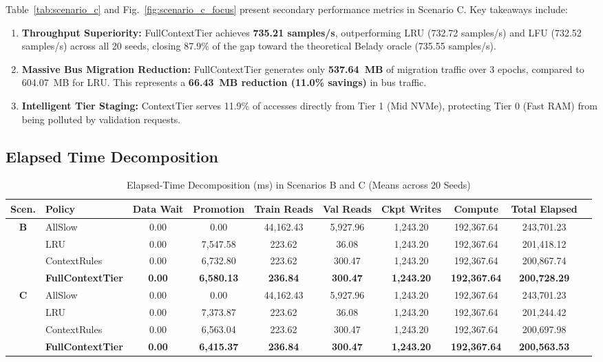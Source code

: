 \documentclass[conference]{IEEEtran}
\begin{document}
Table~\ref{tab:scenario_c} and Fig.~\ref{fig:scenario_c_focus} present secondary performance metrics in Scenario C. Key takeaways include:
\begin{enumerate}
    \item \textbf{Throughput Superiority:} FullContextTier achieves \textbf{735.21 samples/s}, outperforming LRU (732.72 samples/s) and LFU (732.52 samples/s) across all 20 seeds, closing 87.9\% of the gap toward the theoretical Belady oracle (735.55 samples/s).
    \item \textbf{Massive Bus Migration Reduction:} FullContextTier generates only \textbf{537.64~MB} of migration traffic over 3 epochs, compared to 604.07~MB for LRU. This represents a \textbf{66.43~MB reduction (11.0\% savings)} in bus traffic.
    \item \textbf{Intelligent Tier Staging:} ContextTier serves 11.9\% of accesses directly from Tier 1 (Mid NVMe), protecting Tier 0 (Fast RAM) from being polluted by validation requests.
\end{enumerate}

\subsection{Elapsed Time Decomposition}
\label{subsec:decomp}

\begin{table}[t]
\centering
\caption{Elapsed-Time Decomposition (ms) in Scenarios B and C (Means across 20 Seeds)}
\label{tab:elapsed_decomp}
\begin{tabular}{clcccccccc}
\toprule
\textbf{Scen.} & \textbf{Policy} & \textbf{Data Wait} & \textbf{Promotion} & \textbf{Train Reads} & \textbf{Val Reads} & \textbf{Ckpt Writes} & \textbf{Compute} & \textbf{Total Elapsed} \\
\midrule
\multirow{4}{*}{\textbf{B}} 
& AllSlow & 0.00 & 0.00 & 44,162.43 & 5,927.96 & 1,243.20 & 192,367.64 & 243,701.23 \\
& LRU & 0.00 & 7,547.58 & 223.62 & 36.08 & 1,243.20 & 192,367.64 & 201,418.12 \\
& ContextRules & 0.00 & 6,732.80 & 223.62 & 300.47 & 1,243.20 & 192,367.64 & 200,867.74 \\
& \textbf{FullContextTier} & \textbf{0.00} & \textbf{6,580.13} & \textbf{236.84} & \textbf{300.47} & \textbf{1,243.20} & \textbf{192,367.64} & \textbf{200,728.29} \\
\midrule
\multirow{4}{*}{\textbf{C}} 
& AllSlow & 0.00 & 0.00 & 44,162.43 & 5,927.96 & 1,243.20 & 192,367.64 & 243,701.23 \\
& LRU & 0.00 & 7,373.87 & 223.62 & 36.08 & 1,243.20 & 192,367.64 & 201,244.42 \\
& ContextRules & 0.00 & 6,563.04 & 223.62 & 300.47 & 1,243.20 & 192,367.64 & 200,697.98 \\
& \textbf{FullContextTier} & \textbf{0.00} & \textbf{6,415.37} & \textbf{236.84} & \textbf{300.47} & \textbf{1,243.20} & \textbf{192,367.64} & \textbf{200,563.53} \\
\bottomrule
\end{tabular}
\end{table}
\end{document}
